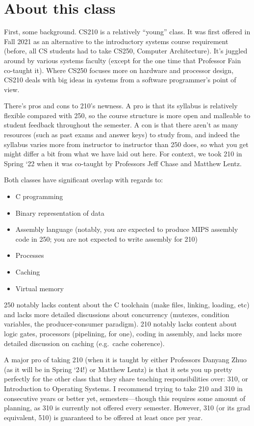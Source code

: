 \documentclass[fontsize=12pt,twoside=on,openright,parskip=half]{scrbook}
\begin{document}
\section*{About this class}

First, some background. CS210 is a relatively “young” class. It was first
offered in Fall 2021 as an alternative to the introductory systems course
requirement (before, all CS students had to take CS250, Computer Architecture).
It’s juggled around by various systems faculty (except for the one time that
Professor Fain co-taught it). Where CS250 focuses more on hardware and
processor design, CS210 deals with big ideas in systems from a software
programmer’s point of view. 

There’s pros and cons to 210’s newness. A pro is that its syllabus is
relatively flexible compared with 250, so the course structure is more open and
malleable to student feedback throughout the semester. A con is that there
aren’t as many resources (such as past exams and answer keys) to study from,
and indeed the syllabus varies more from instructor to instructor than 250
does, so what you get might differ a bit from what we have laid out here. For
context, we took 210 in Spring ‘22 when it was co-taught by Professors Jeff
Chase and Matthew Lentz.

Both classes have significant overlap with regards to:

\begin{itemize}
	\item C programming
	\item Binary representation of data
	\item Assembly language (notably, you are expected to produce MIPS assembly
		code in 250; you are not expected to write assembly for 210)
	\item Processes
	\item Caching
	\item Virtual memory
\end{itemize}

250 notably lacks content about the C toolchain (make files, linking, loading,
etc) and lacks more detailed discussions about concurrency (mutexes, condition
variables, the producer-consumer paradigm). 210 notably lacks content about
logic gates, processors (pipelining, for one), coding in assembly, and lacks
more detailed discussion on caching (e.g.\ cache coherence).

A major pro of taking 210 (when it is taught by either Professors Danyang Zhuo
(as it will be in Spring ‘24!) or Matthew Lentz) is that it sets you up pretty
perfectly for the other class that they share teaching responsibilities over:
310, or Introduction to Operating Systems. I recommend trying to take 210 and
310 in consecutive years or better yet, semesters—though this requires some
amount of planning, as 310 is currently not offered every semester. However,
310 (or its grad equivalent, 510) is guaranteed to be offered at least once per
year.
\end{document}
